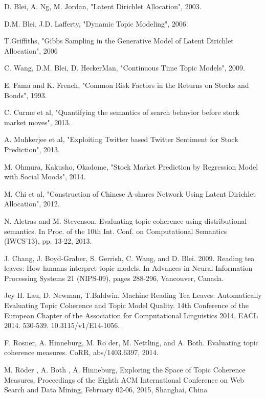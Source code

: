 \documentclass[12pt,journal,letterpaper,oneside,onecolumn]{IEEEtran}
\begin{document}
\begin{thebibliography}{1}
	 D. Blei, A. Ng, M. Jordan,  "Latent Dirichlet Allocation", 2003.
	
	 D.M. Blei, J.D. Lafferty, "Dynamic Topic Modeling", 2006.
	
	 T.Griffiths, "Gibbs Sampling in the Generative Model of Latent 
	Dirichlet Allocation", 2006
	
	C. Wang, D.M. Blei, D. HeckerMan, "Continuous Time Topic Models",
	2009.
	
	 E. Fama and K. French, "Common Risk Factors in the Returns on Stocks and Bonds", 1993.
	
	 C. Curme et al, "Quantifying the semantics of search behavior before stock market moves", 2013.
	
	 A. Muhkerjee et al, "Exploiting Twitter based Twitter Sentiment for Stock Prediction", 2013.
	
	 M. Ohmura, Kakusho, Okadome, "Stock Market Prediction by Regression Model with Social Moods", 2014.
	
	 M. Chi et al, "Construction of Chinese A-shares Network Using Latent Dirichlet Allocation", 2012.
    
    N. Aletras and M. Stevenson. Evaluating topic coherence using distributional semantics. In Proc. of the 10th Int. Conf. on Computational Semantics (IWCS’13), pp. 13-22, 2013.
    
    J. Chang, J. Boyd-Graber, S. Gerrish, C. Wang, and D. Blei. 2009. Reading tea leaves: How humans interpret topic models. In Advances in Neural Information Processing Systems 21 (NIPS-09), pages 288-296, Vancouver, Canada.
    
    Jey H. Lau, D. Newman, T.Baldwin. Machine Reading Tea Leaves: Automatically Evaluating Topic Coherence and Topic Model Quality. 14th Conference of the European Chapter of the Association for Computational Linguistics 2014, EACL 2014. 530-539. 10.3115/v1/E14-1056. 
    
    F. Rosner, A. Hinneburg, M. Ro ̈der, M. Nettling, and A. Both. Evaluating topic coherence measures. CoRR,
    abs/1403.6397, 2014.
    
    M. Röder , A. Both , A. Hinneburg, Exploring the Space of Topic Coherence Measures, Proceedings of the Eighth ACM International Conference on Web Search and Data Mining, February 02-06, 2015, Shanghai, China
    

\end{thebibliography}
\end{document}
